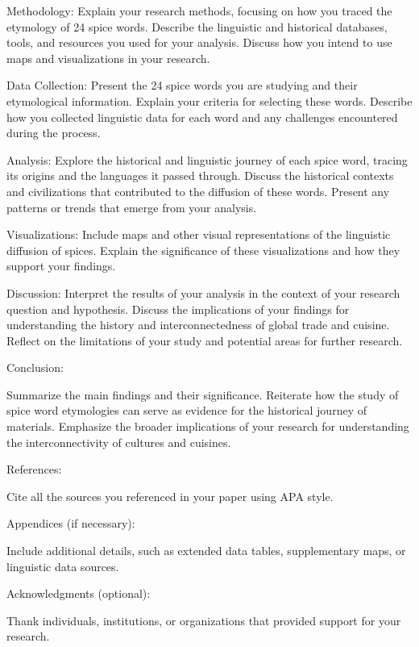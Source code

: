 \documentclass{dsh} %
\begin{document}
    Methodology:
        Explain your research methods, focusing on how you traced the etymology of 24 spice words.
        Describe the linguistic and historical databases, tools, and resources you used for your analysis.
        Discuss how you intend to use maps and visualizations in your research.

    Data Collection:
        Present the 24 spice words you are studying and their etymological information.
        Explain your criteria for selecting these words.
        Describe how you collected linguistic data for each word and any challenges encountered during the process.

    Analysis:
        Explore the historical and linguistic journey of each spice word, tracing its origins and the languages it passed through.
        Discuss the historical contexts and civilizations that contributed to the diffusion of these words.
        Present any patterns or trends that emerge from your analysis.

    Visualizations:
        Include maps and other visual representations of the linguistic diffusion of spices. Explain the significance of these visualizations and how they support your findings.

    Discussion:
        Interpret the results of your analysis in the context of your research question and hypothesis.
        Discuss the implications of your findings for understanding the history and interconnectedness of global trade and cuisine.
        Reflect on the limitations of your study and potential areas for further research.

    Conclusion:

    Summarize the main findings and their significance.
    Reiterate how the study of spice word etymologies can serve as evidence for the historical journey of materials.
    Emphasize the broader implications of your research for understanding the interconnectivity of cultures and cuisines.

    References:

    Cite all the sources you referenced in your paper using APA style.

    Appendices (if necessary):

    Include additional details, such as extended data tables, supplementary maps, or linguistic data sources.

    Acknowledgments (optional):

    Thank individuals, institutions, or organizations that provided support for your research.
\end{document}
